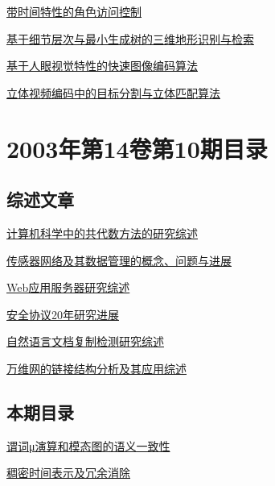 \documentclass[a4paper]{article}
\begin{document}
\href{http://www.jos.org.cn/ch/reader/download_pdf.aspx?file_no=20031118&year_id=2003&quarter_id=11&falg=1}{带时间特性的角色访问控制}

\href{http://www.jos.org.cn/ch/reader/download_pdf.aspx?file_no=20031119&year_id=2003&quarter_id=11&falg=1}{基于细节层次与最小生成树的三维地形识别与检索}

\href{http://www.jos.org.cn/ch/reader/download_pdf.aspx?file_no=20031120&year_id=2003&quarter_id=11&falg=1}{基于人眼视觉特性的快速图像编码算法}

\href{http://www.jos.org.cn/ch/reader/download_pdf.aspx?file_no=20031121&year_id=2003&quarter_id=11&falg=1}{立体视频编码中的目标分割与立体匹配算法}


\section{\textbf{2003年第14卷第10期目录}}
\subsection{综述文章}
\href{http://www.jos.org.cn/ch/reader/download_pdf.aspx?file_no=20031001&year_id=2003&quarter_id=10&falg=1}{计算机科学中的共代数方法的研究综述}

\href{http://www.jos.org.cn/ch/reader/download_pdf.aspx?file_no=20031007&year_id=2003&quarter_id=10&falg=1}{传感器网络及其数据管理的概念、问题与进展}

\href{http://www.jos.org.cn/ch/reader/download_pdf.aspx?file_no=20031008&year_id=2003&quarter_id=10&falg=1}{Web应用服务器研究综述}

\href{http://www.jos.org.cn/ch/reader/download_pdf.aspx?file_no=20031009&year_id=2003&quarter_id=10&falg=1}{安全协议20年研究进展}

\href{http://www.jos.org.cn/ch/reader/download_pdf.aspx?file_no=20031010&year_id=2003&quarter_id=10&falg=1}{自然语言文档复制检测研究综述}

\href{http://www.jos.org.cn/ch/reader/download_pdf.aspx?file_no=20031012&year_id=2003&quarter_id=10&falg=1}{万维网的链接结构分析及其应用综述}

\subsection{本期目录}
\href{http://www.jos.org.cn/ch/reader/download_pdf.aspx?file_no=20031002&year_id=2003&quarter_id=10&falg=1}{谓词μ演算和模态图的语义一致性}

\href{http://www.jos.org.cn/ch/reader/download_pdf.aspx?file_no=20031003&year_id=2003&quarter_id=10&falg=1}{稠密时间表示及冗余消除}
\end{document}
